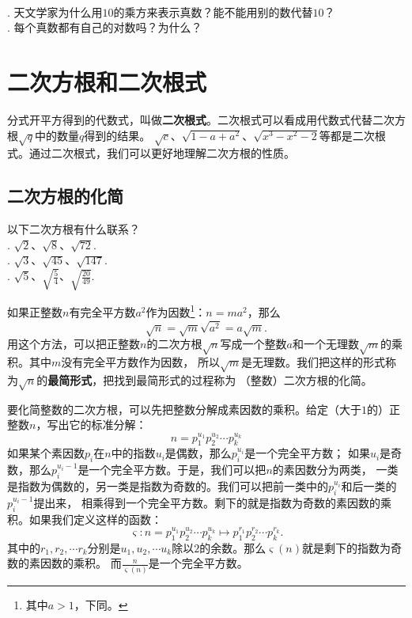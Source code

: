 \documentclass[12pt,UTF8,fontset=none]{ctexbook}
\begin{document}
\clearpage

\begin{sk}
    \mbox{}\\
    . 天文学家为什么用$10$的乘方来表示真数？能不能用别的数代替$10$？\\
    . 每个真数都有自己的对数吗？为什么？
\end{sk}

\chapter{二次方根和二次根式}
分式开平方得到的代数式，叫做\textbf{二次根式}。二次根式可以看成用代数式代替二次方根$\sqrt{q}$中的数量$q$得到的结果。
$\sqrt{c}$、$\sqrt{1 - a + a^2}$、$\sqrt{x^3 - x^2 - 2}$等都是二次根式。通过二次根式，我们可以更好地理解二次方根的性质。

\section{二次方根的化简}
\begin{sk}\label{sk:3-0-0}
    以下二次方根有什么联系？\\
    . $\sqrt{2}$、$\sqrt{8}$、$\sqrt{72}$.\\
    . $\sqrt{3}$、$\sqrt{45}$、$\sqrt{147}$.\\
    . $\sqrt{5}$、$\sqrt{\frac{5}{4}}$、$\sqrt{\frac{20}{49}}$.
\end{sk}
如果正整数$n$有完全平方数$a^2$作为因数\footnote{其中$a>1$，下同。}：$n = ma^2$，那么
$$\sqrt{n} = \sqrt{m}\sqrt{a^2} = a\sqrt{m}.$$
用这个方法，可以把正整数$n$的二次方根$\sqrt{n}$写成一个整数$a$和一个无理数$\sqrt{m}$的乘积。其中$m$没有完全平方数作为因数，
所以$\sqrt{m}$是无理数。我们把这样的形式称为$\sqrt{n}$的\textbf{最简形式}，把找到最简形式的过程称为
（整数）二次方根的化简。

要化简整数的二次方根，可以先把整数分解成素因数的乘积。给定（大于$1$的）正整数$n$，写出它的标准分解：
$$n = p_1^{u_1} p_2^{u_2} \cdots p_k^{u_k}$$
如果某个素因数$p_i$在$n$中的指数$u_i$是偶数，那么$p_i^{u_i}$是一个完全平方数；
如果$u_i$是奇数，那么$p_i^{u_i-1}$是一个完全平方数。于是，我们可以把$n$的素因数分为两类，
一类是指数为偶数的，另一类是指数为奇数的。我们可以把前一类中的$p_i^{u_i}$和后一类的$p_i^{u_i-1}$提出来，
相乘得到一个完全平方数。剩下的就是指数为奇数的素因数的乘积。如果我们定义这样的函数：
$$ \varsigma: n = p_1^{u_1} p_2^{u_2} \cdots p_k^{u_k} \mapsto p_1^{r_1} p_2^{r_2} \cdots p_k^{r_k}. $$
其中的$r_1, r_2, \cdots r_k$分别是$u_1, u_2, \cdots u_k$除以$2$的余数。那么$\varsigma(n)$就是剩下的指数为奇数的素因数的乘积。
而$\frac{n}{\varsigma(n)}$是一个完全平方数。
\end{document}
